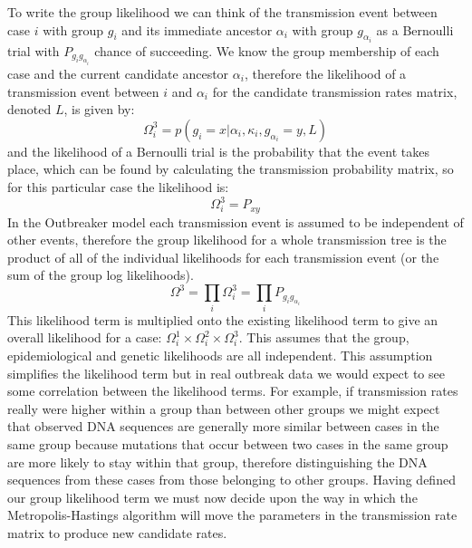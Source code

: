 \documentclass[11pt,a4paper]{report}
\begin{document}
To write the group likelihood we can think of the transmission event between case $i$ with group $g_i$ and its immediate ancestor $\alpha_i$ with group $g_{\alpha_{i}}$ as a Bernoulli trial with $P_{g_i g_{\alpha_{i}}}$ chance of succeeding. We know the group membership of each case and the current candidate ancestor $\alpha_i$, therefore the likelihood of a transmission event between $i$ and $\alpha_i$ for the candidate transmission rates matrix, denoted $L$, is given by:
\[ \Omega_i^3 = p(g_i = x | \alpha_i, \kappa_i, g_{\alpha_i}=y, L) \]
and the likelihood of a Bernoulli trial is the probability that the event takes place, which can be found by calculating the transmission probability matrix, so for this particular case the likelihood is:
\[ \Omega_i^3 = P_{xy} \]
In the Outbreaker model each transmission event is assumed to be independent of other events, therefore the group likelihood for a whole transmission tree is the product of all of the individual likelihoods for each transmission event (or the sum of the group log likelihoods).
\[ \Omega^3 = \prod_i{\Omega_i^3} = \prod_i{P_{g_i g_{\alpha_i}}} \]
This likelihood term is multiplied onto the existing likelihood term to give an overall likelihood for a case: $\Omega_i^1 \times \Omega_i^2 \times \Omega_i^3$. This assumes that the group, epidemiological and genetic likelihoods are all independent. This assumption simplifies the likelihood term but in real outbreak data we would expect to see some correlation between the likelihood terms. For example, if transmission rates really were higher within a group than between other groups we might expect that observed DNA sequences are generally more similar between cases in the same group because mutations that occur between two cases in the same group are more likely to stay within that group, therefore distinguishing the DNA sequences from these cases from those belonging to other groups. Having defined our group likelihood term we must now decide upon the way in which the Metropolis-Hastings algorithm will move the parameters in the transmission rate matrix to produce new candidate rates.
\end{document}
